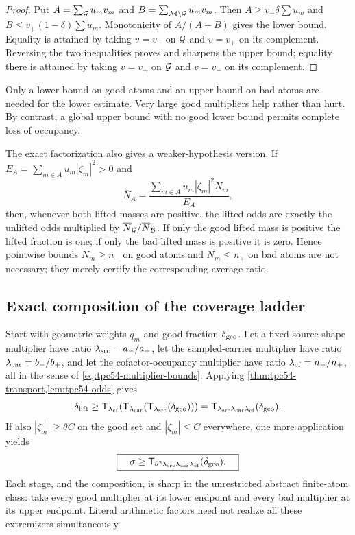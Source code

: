 \begin{proof}
Put \(A=\sum_{\mathcal G}u_mv_m\) and
\(B=\sum_{\mathcal M\setminus\mathcal G}u_mv_m\).  Then
\(A\ge v_-\delta\sum u_m\) and
\(B\le v_+(1-\delta)\sum u_m\).  Monotonicity of \(A/(A+B)\) gives the
 lower bound.  Equality is attained by taking \(v=v_-\) on \(\mathcal G\) and
\(v=v_+\) on its complement.  Reversing the two inequalities proves and
sharpens the upper bound; equality there is attained by taking
\(v=v_+\) on \(\mathcal G\) and \(v=v_-\) on its complement.
\end{proof}

Only a lower bound on good atoms and an upper bound on bad atoms are needed
for the lower estimate.  Very large good multipliers help rather than
hurt.  By contrast, a global upper bound with no good lower bound permits
complete loss of occupancy.

The exact factorization also gives a weaker-hypothesis version.  If
\(E_A=\sum_{m\in A}u_m|\zeta_m|^2>0\) and
\[
 \overline N_A
 =\frac{\sum_{m\in A}u_m|\zeta_m|^2N_m}{E_A},
\]
then, whenever both lifted masses are positive, the lifted odds are
exactly the unlifted odds multiplied by
\(\overline N_{\mathcal G}/\overline N_{\mathcal B}\).  If only the good lifted mass is
positive the lifted fraction is one; if only the bad lifted mass is
positive it is zero.  Hence pointwise bounds
\(N_m\ge n_-\) on good atoms and \(N_m\le n_+\) on bad atoms are not
necessary; they merely certify the corresponding average ratio.

\subsection{Exact composition of the coverage ladder}

Start with geometric weights \(q_m\) and good fraction
\(\delta_{\rm geo}\).  Let a fixed source-shape multiplier have ratio
\(\lambda_{\rm src}=a_-/a_+\), let the sampled-carrier multiplier have
ratio \(\lambda_{\rm car}=b_-/b_+\), and let the cofactor-occupancy
multiplier have ratio \(\lambda_{\rm cf}=n_-/n_+\), all in the sense of
\eqref{eq:tpc54-multiplier-bounds}.  Applying
\cref{thm:tpc54-transport,lem:tpc54-odds} gives
\begin{equation}
 \delta_{\rm lift}
 \ge
 \mathsf T_{\lambda_{\rm cf}}
  \!\left(\mathsf T_{\lambda_{\rm car}}
  \!\left(\mathsf T_{\lambda_{\rm src}}
  (\delta_{\rm geo})\right)\right)
 =\mathsf T_{\lambda_{\rm src}\lambda_{\rm car}\lambda_{\rm cf}}
  (\delta_{\rm geo}).
 \label{eq:tpc54-lifted-composition}
\end{equation}
If also \(|\zeta_m|\ge\theta C\) on the good set and
\(|\zeta_m|\le C\) everywhere, one more application yields
\begin{equation}
 \boxed{\quad
 \sigma\ge
 \mathsf T_{\theta^2\lambda_{\rm src}\lambda_{\rm car}\lambda_{\rm cf}}
  (\delta_{\rm geo}).
 \quad}
 \label{eq:tpc54-full-composition}
\end{equation}
Each stage, and the composition, is sharp in the unrestricted abstract
finite-atom class: take every good multiplier at its lower endpoint and
every bad multiplier at its upper endpoint.  Literal arithmetic factors
need not realize all these extremizers simultaneously.

